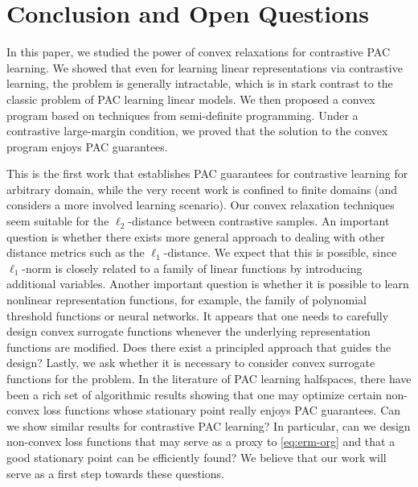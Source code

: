 \section{Conclusion and Open Questions}\label{sec:con}

In this paper, we studied the power of convex relaxations for contrastive PAC learning. We showed that even for learning linear representations via contrastive learning, the problem is generally intractable, which is in stark contrast to the classic problem of PAC learning linear models. We then proposed a convex program based on techniques from semi-definite programming. Under a contrastive large-margin condition, we proved that the solution to the convex program enjoys PAC guarantees.

This is the first work that establishes PAC guarantees for contrastive learning for arbitrary domain, while the very recent work is confined to finite domains (and considers a more involved learning scenario). Our convex relaxation techniques seem suitable for the $\ell_2$-distance between contrastive samples. An important question is whether there exists more general approach to dealing with other distance metrics such as the $\ell_1$-distance. We expect that this is possible, since $\ell_1$-norm is closely related to a family of linear functions by introducing additional variables. Another important question is whether it is possible to learn nonlinear representation functions, for example, the family of polynomial threshold functions or neural networks. It appears that one needs to carefully design convex surrogate functions whenever the underlying representation functions are modified. Does there exist a principled approach that guides the design? Lastly, we ask whether it is necessary to consider convex surrogate functions for the problem. In the literature of PAC learning halfspaces, there have been a rich set of algorithmic results showing that one may optimize certain non-convex loss functions whose stationary point really enjoys PAC guarantees. Can we show similar results for contrastive PAC learning? In particular, can we design non-convex loss functions that may serve as a proxy to \eqref{eq:erm-org} and that a good stationary point can be efficiently found? We believe that our work will serve as a first step towards these questions.
